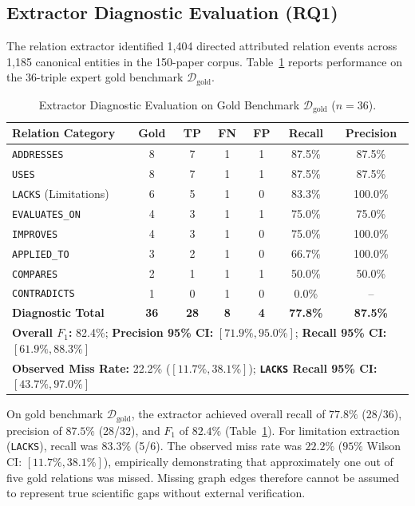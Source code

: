 \documentclass[runningheads]{llncs}
\begin{document}
\subsection{Extractor Diagnostic Evaluation (RQ1)}
The relation extractor identified 1,404 directed attributed relation events across 1,185 canonical entities in the 150-paper corpus. Table~\ref{tab:gold} reports performance on the 36-triple expert gold benchmark $\mathcal{D}_{\text{gold}}$.

\begin{table}[htbp]
\centering
\caption{Extractor Diagnostic Evaluation on Gold Benchmark $\mathcal{D}_{\text{gold}}$ ($n = 36$).}
\label{tab:gold}
\scriptsize
\setlength{\tabcolsep}{3pt}
\renewcommand{\arraystretch}{0.92}
\begin{tabular}{lcccccc}
\toprule
\textbf{Relation Category} & \textbf{Gold} & \textbf{TP} & \textbf{FN} & \textbf{FP} & \textbf{Recall} & \textbf{Precision} \\
\midrule
\texttt{ADDRESSES} & 8 & 7 & 1 & 1 & 87.5\% & 87.5\% \\
\texttt{USES} & 8 & 7 & 1 & 1 & 87.5\% & 87.5\% \\
\texttt{LACKS} (Limitations) & 6 & 5 & 1 & 0 & 83.3\% & 100.0\% \\
\texttt{EVALUATES\_ON} & 4 & 3 & 1 & 1 & 75.0\% & 75.0\% \\
\texttt{IMPROVES} & 4 & 3 & 1 & 0 & 75.0\% & 100.0\% \\
\texttt{APPLIED\_TO} & 3 & 2 & 1 & 0 & 66.7\% & 100.0\% \\
\texttt{COMPARES} & 2 & 1 & 1 & 1 & 50.0\% & 50.0\% \\
\texttt{CONTRADICTS} & 1 & 0 & 1 & 0 & 0.0\% & -- \\
\midrule
\textbf{Diagnostic Total} & \textbf{36} & \textbf{28} & \textbf{8} & \textbf{4} & \textbf{77.8\%} & \textbf{87.5\%} \\
\midrule
\multicolumn{7}{l}{\textbf{Overall $F_1$:} 82.4\%; \textbf{Precision 95\% CI:} $[71.9\%, 95.0\%]$; \textbf{Recall 95\% CI:} $[61.9\%, 88.3\%]$} \\
\multicolumn{7}{l}{\textbf{Observed Miss Rate:} 22.2\% ($[11.7\%, 38.1\%]$); \textbf{\texttt{LACKS} Recall 95\% CI:} $[43.7\%, 97.0\%]$} \\
\bottomrule
\end{tabular}
\end{table}

On gold benchmark $\mathcal{D}_{\text{gold}}$, the extractor achieved overall recall of $77.8\%$ (28/36), precision of $87.5\%$ (28/32), and $F_1$ of $82.4\%$ (Table~\ref{tab:gold}). For limitation extraction (\texttt{LACKS}), recall was $83.3\%$ (5/6). The observed miss rate was $22.2\%$ ($95\%$ Wilson CI: $[11.7\%, 38.1\%]$), empirically demonstrating that approximately one out of five gold relations was missed. Missing graph edges therefore cannot be assumed to represent true scientific gaps without external verification.
\end{document}
